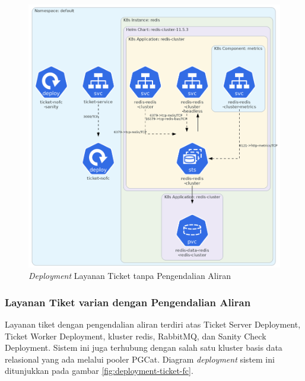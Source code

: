 \begin{figure}[htbp]
    \centering
    \includegraphics[width=1\textwidth]{resources/chapter-4/ticket-nofc.png}
    \caption{\textit{Deployment} Layanan Ticket tanpa Pengendalian Aliran}
    \label{fig:deployment-ticket-nofc}
\end{figure}

\pagebreak

\subsubsection{Layanan Tiket varian dengan Pengendalian Aliran}

Layanan tiket dengan pengendalian aliran terdiri atas Ticket Server Deployment, Ticket Worker Deployment, kluster redis, RabbitMQ, dan Sanity Check Deployment. Sistem ini juga terhubung dengan salah satu kluster basis data relasional yang ada melalui pooler PGCat. Diagram \textit{deployment} sistem ini ditunjukkan pada gambar \ref{fig:deployment-ticket-fc}.

